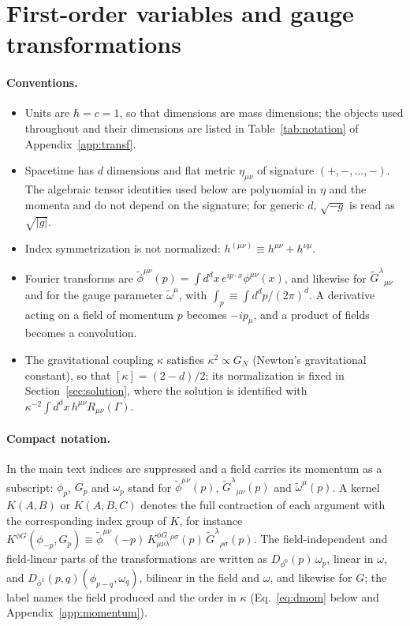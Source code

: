 \documentclass[prd,aps,preprint,nofootinbib,amsmath,amssymb,eqsecnum]{revtex4-2}
\newcommand{\tomega}{\tilde{\omega}}
\newcommand{\p}{\tilde{\phi}}
\newcommand{\G}{\tilde{G}}
\newcommand{\ip}[1]{\int_{#1}}
\begin{document}
\section{First-order variables and gauge transformations}
\label{sec:variables}

\paragraph{Conventions.}
\begin{itemize}
\item Units are $\hbar=c=1$, so that dimensions are mass dimensions; the objects used
throughout and their dimensions are listed in Table~\ref{tab:notation} of
Appendix~\ref{app:transf}.
\item Spacetime has $d$ dimensions and flat metric $\eta_{\mu\nu}$ of signature
$(+,-,\dots,-)$. The algebraic tensor identities used below are polynomial in $\eta$ and the
momenta and do not depend on the signature; for generic $d$, $\sqrt{-g}$ is read as
$\sqrt{|g|}$.
\item Index symmetrization is not normalized: $h^{(\mu\nu)}\equiv h^{\mu\nu}+h^{\nu\mu}$.
\item Fourier transforms are $\p^{\mu\nu}(p)=\int d^dx\,e^{ip\cdot x}\phi^{\mu\nu}(x)$, and
likewise for $\G^{\lambda}{}_{\mu\nu}$ and for the gauge parameter $\tomega^\mu$, with
$\ip{p}\equiv\int d^dp/(2\pi)^d$. A derivative acting on a field of momentum $p$ becomes
$-ip_\mu$, and a product of fields becomes a convolution.
\item The gravitational coupling $\kappa$ satisfies $\kappa^2\propto G_N$ (Newton's gravitational constant), so that
$[\kappa]=(2-d)/2$; its normalization is fixed in Section~\ref{sec:solution}, where the
solution is identified with $\kappa^{-2}\int d^dx\,h^{\mu\nu}R_{\mu\nu}(\Gamma)$.
\end{itemize}

\paragraph{Compact notation.} In the main text indices are suppressed and a field carries
its momentum as a subscript: $\phi_p$, $G_p$ and $\omega_p$ stand for $\p^{\mu\nu}(p)$,
$\G^{\lambda}{}_{\mu\nu}(p)$ and $\tomega^\mu(p)$. A kernel $K(A,B)$ or $K(A,B,C)$ denotes the
full contraction of each argument with the corresponding index group of $K$, for instance
$K^{\phi G}(\phi_{-p},G_p)\equiv\p^{\mu\nu}(-p)\,K^{\phi G}_{\mu\nu\lambda}{}^{\rho\sigma}(p)\,\G^{\lambda}{}_{\rho\sigma}(p)$.
The field-independent and field-linear parts of the transformations are written as
$D_{\phi^0}(p)\,\omega_p$, linear in $\omega$, and $D_{\phi^1}(p,q)(\phi_{p-q},\omega_q)$, bilinear in the field and $\omega$, and
likewise for $G$; the label names the field produced and the order in $\kappa$
(Eq.~\eqref{eq:dmom} below and Appendix~\ref{app:momentum}).
\end{document}
